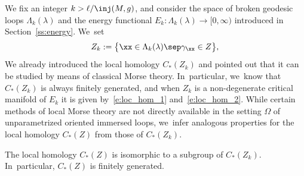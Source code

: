 We fix an integer $k>\ell/\inj(M,g)$, and consider the space of broken geodesic loops $\Lambda_k(\lambda)$ and the energy functional $E_k:\Lambda_k(\lambda)\to[0,\infty)$ introduced in Section~\ref{ss:energy}. We~set
\begin{align*}
Z_k:=\big\{\xx\in\Lambda_k(\lambda)\sep \gamma_{\xx}\in Z \big\},
\end{align*}
We already introduced the local homology $C_*(Z_k)$ and pointed out that it can be studied by means of classical Morse theory. In~particular, we~know that $C_*(Z_k)$ is always finitely generated, and when $Z_k$ is a non-degenerate critical manifold of $E_k$ it is given by~\eqref{e:loc_hom_1} and~\eqref{e:loc_hom_2}. While certain methods of local Morse theory are not directly available in the setting $\Omega$ of unparametrized oriented immersed loops, we~infer analogous properties for the local homology $C_*(Z)$ from those of $C_*(Z_k)$.

\begin{Lemma}\label{l:finitely_generated}
The local homology $C_*(Z)$ is isomorphic to a subgroup of $C_*(Z_k)$. In~particular, $C_*(Z)$ is finitely generated.
\end{Lemma}

